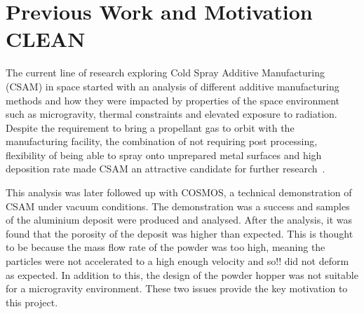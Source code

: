 \section{Previous Work and Motivation CLEAN}
The current line of research exploring Cold Spray Additive Manufacturing (CSAM) in space started with an analysis of different additive manufacturing methods and how they were impacted by properties of the space environment such as microgravity, thermal constraints and elevated exposure to radiation. Despite the requirement to bring a propellant gas to orbit with the manufacturing facility, the combination of not requiring post processing, flexibility of being able to spray onto unprepared metal surfaces and high deposition rate made CSAM an attractive candidate for further research~\cite{malagowski2019amspace}.

This analysis was later followed up with COSMOS, a technical demonstration of CSAM under vacuum conditions. The demonstration was a success and samples of the aluminium deposit were produced and analysed. After the analysis, it was found that the porosity of the deposit was higher than expected. This is thought to be because the mass flow rate of the powder was too high, meaning the particles were not accelerated to a high enough velocity and so!! did not deform as expected. In addition to this, the design of the powder hopper was not suitable for a microgravity environment. These two issues provide the key motivation to this project.

\newpage

